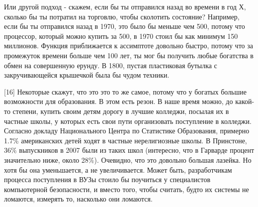 \documentclass[ebook,12pt,oneside,openany]{memoir}
\begin{document}
Или другой подход - скажем, если бы ты отправился назад во времени в
год Х, сколько бы ты потратил на торговлю, чтобы сколотить состояние?
Например, если бы ты отправился назад в 1970, это было бы меньше чем
500, потому что процессор, который можно купить за 500, в 1970 стоил
бы как минимум 150 миллионов. Функция приближается к ассимптоте
довольно быстро, потому что за промежуток времени больше чем 100 лет,
ты мог бы получить любые богатства в обмен на совершенную ерунду. В
1800, пустая пластиковая бутылка с закручивающейся крышечкой была бы
чудом техники.

[16] Некоторые скажут, что это это то же самое, потому что у богатых
большие возможности для образования. В этом есть резон. В наше время
можно, до какой-то степени, купить своим детям дорогу в лучшие
колледжи, посылая их в частные школы, у которых есть свои пути
организовать поступление в колледжи. Согласно докладу Национального
Центра по Статистике Образования, примерно 1.7\% американских детей
ходят в частные нерелигиозные школы. В Принстоне, 36\% выпускников в
2007 были из таких школ (интересно, что в Гарварде процент значительно
ниже, около 28\%). Очевидно, что это довольно большая лазейка. Но хотя
бы она уменьшается, а не увеличивается. Может быть, разработчикам
процесса поступления в ВУЗы стоило бы поучиться у специалистов
компьютерной безопасности, и вместо того, чтобы считать, будто их
системы не ломаются, измерять то, насколько они ломаются.
\end{document}
